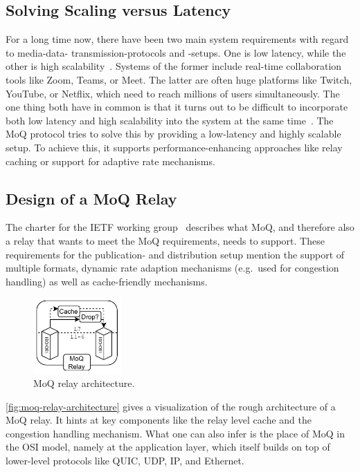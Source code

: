 \subsection{Solving Scaling versus Latency}
For a long time now, there have been two main system requirements with regard to media-data-
transmission-protocols and -setups.
One is low latency, while the other is high scalability~\parencite{what-is-moq}.
Systems of the former include real-time collaboration tools like Zoom, Teams, or Meet.
The latter are often huge platforms like Twitch, YouTube, or Netflix, which need to 
reach millions of users simultaneously.
The one thing both have in common is that it turns out to be difficult to incorporate both 
low latency and high scalability into the system at the same time~\parencite{what-is-moq}.
The MoQ protocol tries to solve this by providing a low-latency and
highly scalable setup.
To achieve this, it supports performance-enhancing approaches like relay caching or support 
for adaptive rate mechanisms. %

\subsection{Design of a MoQ Relay}
The charter for the IETF working group~\parencite{moq-charter} describes what MoQ, and therefore also a relay that wants to meet the MoQ requirements, needs to support.
These requirements for the publication- and distribution setup mention the support of 
multiple formats, dynamic rate adaption mechanisms (e.g.~used for congestion handling)
as well as cache-friendly mechanisms.

\begin{figure}[H]
    \centering
    \includegraphics[width=0.3\textwidth]{figures/02_background/moq-relay.drawio.pdf}
    \caption[MoQ relay architecture]{MoQ relay architecture.}\label{fig:moq-relay-architecture}
\end{figure}

\autoref{fig:moq-relay-architecture} gives a visualization of the rough architecture
of a MoQ relay.
It hints at key components like the relay level cache and the congestion handling
mechanism.
What one can also infer is the place of MoQ in the OSI model, namely at the application
layer, which itself builds on top of lower-level protocols like QUIC, UDP, IP, and Ethernet.

